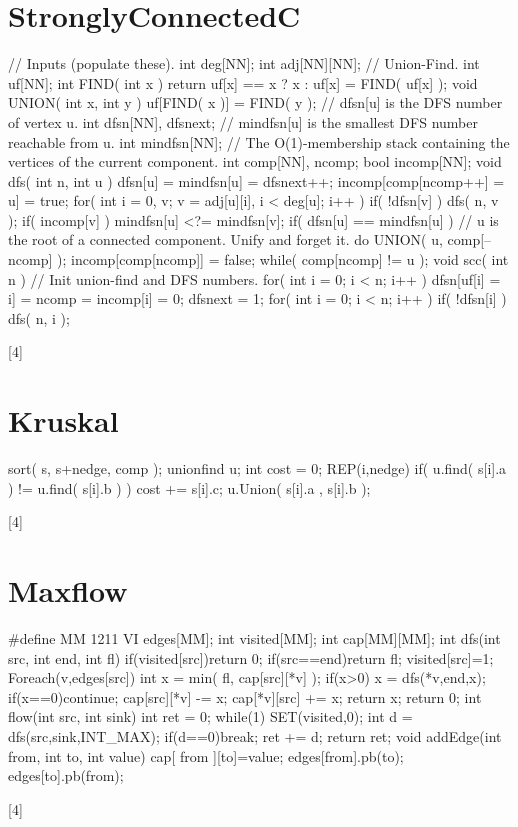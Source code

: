 \documentclass[a4paper,9pt]{article}
\begin{document}
\section{StronglyConnectedC}
\begin{verbatimtab}[4]
	// Inputs (populate these).
	int deg[NN]; int adj[NN][NN];
	// Union-Find.
	int uf[NN];
	int FIND( int x ) { return uf[x] == x ? x : uf[x] = FIND( uf[x] ); }
	void UNION( int x, int y ) { uf[FIND( x )] = FIND( y ); }
	// dfsn[u] is the DFS number of vertex u.
	int dfsn[NN], dfsnext;
	// mindfsn[u] is the smallest DFS number reachable from u.
	int mindfsn[NN];
	// The O(1)-membership stack containing the vertices of the current component.
	int comp[NN], ncomp;
	bool incomp[NN];
	void dfs( int n, int u ) {
	  dfsn[u] = mindfsn[u] = dfsnext++;
	  incomp[comp[ncomp++] = u] = true;
	  for( int i = 0, v; v = adj[u][i], i < deg[u]; i++ ) {
		if( !dfsn[v] ) dfs( n, v );
		if( incomp[v] ) mindfsn[u] <?= mindfsn[v];
	  }
	  if( dfsn[u] == mindfsn[u] ) {
		// u is the root of a connected component. Unify and forget it.
		do {
		  UNION( u, comp[--ncomp] );
		  incomp[comp[ncomp]] = false;
		} while( comp[ncomp] != u );
	  }
	}
	void scc( int n ) {
	  // Init union-find and DFS numbers.
	  for( int i = 0; i < n; i++ ) dfsn[uf[i] = i] = ncomp = incomp[i] = 0;
	  dfsnext = 1;
	  for( int i = 0; i < n; i++ ) if( !dfsn[i] ) dfs( n, i );
	}
\end{verbatimtab}[4]

\section{Kruskal}
\begin{verbatimtab}[4]
	sort( s, s+nedge, comp );
	unionfind u;
	int cost = 0;
	REP(i,nedge) {
		if( u.find( s[i].a ) != u.find( s[i].b ) ) {
			cost += s[i].c;
			u.Union( s[i].a , s[i].b );
		}
	}
\end{verbatimtab}[4]

\section{Maxflow}
\begin{verbatimtab}[4]
	#define MM 1211
	VI edges[MM];
	int visited[MM];
	int cap[MM][MM];
	int dfs(int src, int end, int fl) {
		if(visited[src])return 0;
		if(src==end)return fl;
		visited[src]=1;
		Foreach(v,edges[src]) {
			int x = min( fl, cap[src][*v] );
			if(x>0) {
				x = dfs(*v,end,x);
				if(x==0)continue;
				cap[src][*v] -= x;
				cap[*v][src] += x;
				return x;
			}
		}
		return 0;
	}
	int flow(int src, int sink) {
		int ret = 0;
		while(1) {
			SET(visited,0);
			int d = dfs(src,sink,INT_MAX);
			if(d==0)break;
			ret += d;
		}
		return ret;
	}
	void addEdge(int from, int to, int value) {
		cap[ from ][to]=value;
		edges[from].pb(to);
		edges[to].pb(from);
	}
\end{verbatimtab}[4]
\end{document}

